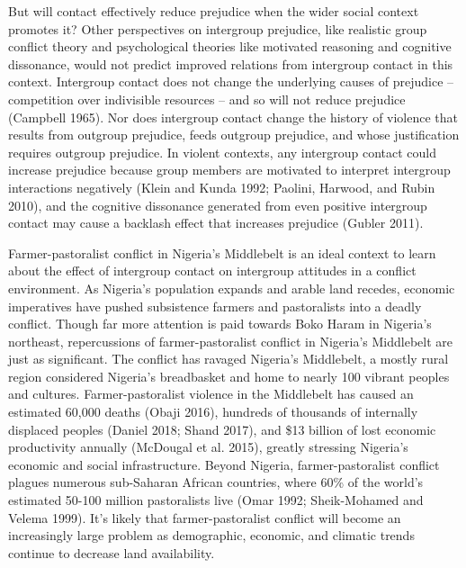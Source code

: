 \documentclass[11pt]{article}
\begin{document}
But will contact effectively reduce prejudice when the wider social
context promotes it? Other perspectives on intergroup prejudice, like
realistic group conflict theory and psychological theories like
motivated reasoning and cognitive dissonance, would not predict improved
relations from intergroup contact in this context. Intergroup contact
does not change the underlying causes of prejudice -- competition over
indivisible resources -- and so will not reduce prejudice (Campbell
1965). Nor does intergroup contact change the history of violence that
results from outgroup prejudice, feeds outgroup prejudice, and whose
justification requires outgroup prejudice. In violent contexts, any
intergroup contact could increase prejudice because group members are
motivated to interpret intergroup interactions negatively (Klein and
Kunda 1992; Paolini, Harwood, and Rubin 2010), and the cognitive
dissonance generated from even positive intergroup contact may cause a
backlash effect that increases prejudice (Gubler 2011).

Farmer-pastoralist conflict in Nigeria's Middlebelt is an ideal context
to learn about the effect of intergroup contact on intergroup attitudes
in a conflict environment. As Nigeria's population expands and arable
land recedes, economic imperatives have pushed subsistence farmers and
pastoralists into a deadly conflict. Though far more attention is paid
towards Boko Haram in Nigeria's northeast, repercussions of
farmer-pastoralist conflict in Nigeria's Middlebelt are just as
significant. The conflict has ravaged Nigeria's Middlebelt, a mostly
rural region considered Nigeria's breadbasket and home to nearly 100
vibrant peoples and cultures. Farmer-pastoralist violence in the
Middlebelt has caused an estimated 60,000 deaths (Obaji 2016), hundreds
of thousands of internally displaced peoples (Daniel 2018; Shand 2017),
and \$13 billion of lost economic productivity annually (McDougal et al.
2015), greatly stressing Nigeria's economic and social infrastructure.
Beyond Nigeria, farmer-pastoralist conflict plagues numerous sub-Saharan
African countries, where 60\% of the world's estimated 50-100 million
pastoralists live (Omar 1992; Sheik-Mohamed and Velema 1999). It's
likely that farmer-pastoralist conflict will become an increasingly
large problem as demographic, economic, and climatic trends continue to
decrease land availability.
\end{document}
